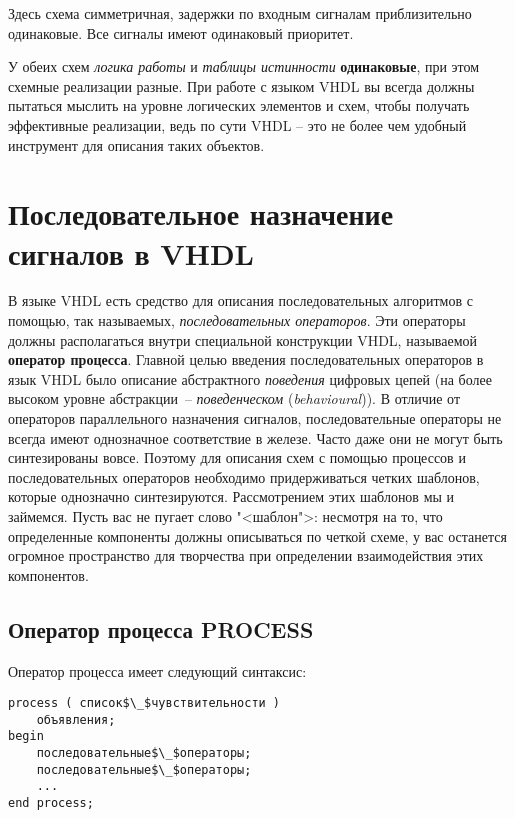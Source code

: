 Здесь схема симметричная, задержки по входным сигналам приблизительно одинаковые. Все сигналы имеют одинаковый приоритет.

У обеих схем \emph{логика работы} и \emph{таблицы истинности} \textbf{одинаковые}, при этом схемные реализации разные. При работе с языком VHDL вы всегда должны пытаться мыслить на уровне логических элементов и схем, чтобы получать эффективные реализации, ведь по сути VHDL – это не более чем удобный инструмент для описания таких объектов. 

\section{Последовательное назначение сигналов в VHDL}

В языке VHDL есть средство для описания последовательных алгоритмов с помощью, так называемых, \emph{последовательных операторов}. Эти операторы должны располагаться внутри специальной конструкции VHDL, называемой \textbf{оператор процесса}. Главной целью введения последовательных операторов в язык VHDL было описание абстрактного \emph{поведения} цифровых цепей (на более высоком уровне абстракции~-- \emph{поведенческом} (\emph{behavioural})). В отличие от операторов параллельного назначения сигналов, последовательные операторы не всегда имеют однозначное соответствие в железе. Часто даже они не могут быть синтезированы вовсе. Поэтому для описания схем с помощью процессов и последовательных операторов необходимо придерживаться четких шаблонов, которые однозначно синтезируются. Рассмотрением этих шаблонов мы и займемся. Пусть вас не пугает слово "<шаблон">: несмотря на то, что определенные компоненты должны описываться по четкой схеме, у вас останется огромное пространство для творчества при определении взаимодействия этих компонентов. 

\subsection{Оператор процесса PROCESS}

Оператор процесса имеет следующий синтаксис:

\begin{Code}
\begin{lstlisting}[mathescape]
process ( список$\_$чувствительности )
    объявления;
begin
    последовательные$\_$операторы;
    последовательные$\_$операторы;
    ...
end process;
\end{lstlisting}
\end{Code}

